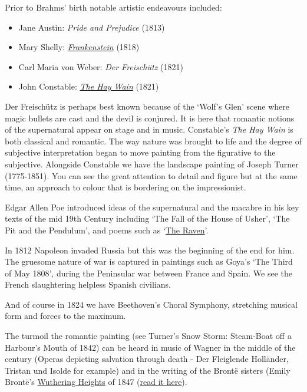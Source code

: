 Prior to Brahms' birth notable artistic endeavours included:
\begin{itemize}
\item Jane Austin: \textit{Pride and Prejudice} (1813)
\item Mary Shelly: \textit{\href{http://www.gutenberg.org/files/84/84-h/84-h.htm}{Frankenstein}} (1818)
\item Carl Maria von Weber: \textit{Der Freisch\"utz} (1821)
\item John Constable: \textit{\href{http://www.nationalgallery.org.uk/paintings/john-constable-the-hay-wain}{The Hay Wain}} (1821)  
\end{itemize}

Der Freisch\"utz is perhaps best known because of the `Wolf's Glen' scene where magic bullets are cast and the devil is conjured. It is here that romantic notions of the supernatural appear on stage and in music. Constable's \textit{The Hay Wain} is both classical and romantic. The way nature was brought to life and the degree of subjective interpretation began to move painting from the figurative to the subjective. Alongside Constable we have the landscape painting of Joseph Turner (1775-1851). You can see the great attention to detail and figure but at the same time, an approach to colour that is bordering on the impressionist. 

Edgar Allen Poe introduced ideas of the supernatural and the macabre in his key texts of the mid 19th Century including `The Fall of the House of Usher', `The Pit and the Pendulum', and poems such as `\href{https://www.youtube.com/watch?v=0K6-wO94-6I}{The Raven}'.  


In 1812 Napoleon invaded Russia but this was the beginning of the end for him. The gruesome nature of war is captured in paintings such as Goya's `The Third of May 1808', during the Peninsular war between France and Spain. We see the French slaughtering helpless Spanish civilians.   

And of course in 1824 we have Beethoven's Choral Symphony, stretching musical form and forces to the maximum. 

The turmoil the romantic painting (see Turner's Snow Storm: Steam-Boat off a Harbour's Mouth of 1842) can be heard in music of Wagner in the middle of the century (Operas depicting salvation through death - Der Fleiglende Holl\"ander, Tristan und Isolde for example) and in the writing of the Bront\"e sisters (Emily Bront\"e's \href{http://www.wuthering-heights.co.uk/index.php}{Wuthering Heights} of 1847 (\href{http://www.gutenberg.org/ebooks/768}{read it here}).

